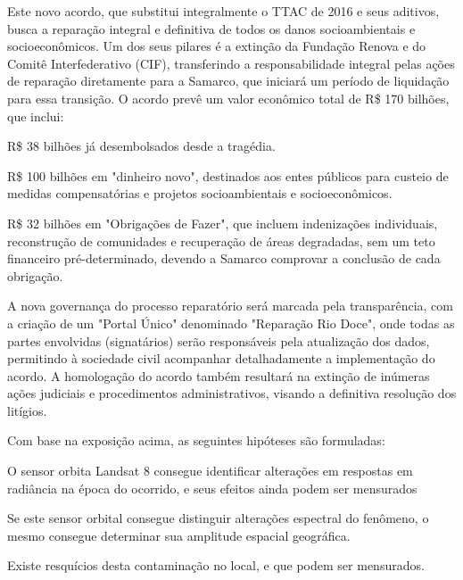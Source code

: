 %
\hspace*{1.25 cm} Este novo acordo, que substitui integralmente o TTAC de 2016 e seus aditivos, busca a reparação integral e definitiva de todos os danos socioambientais e socioeconômicos. Um dos seus pilares é a extinção da Fundação Renova e do Comitê Interfederativo (CIF), transferindo a responsabilidade integral pelas ações de reparação diretamente para a Samarco, que iniciará um período de liquidação para essa transição. O acordo prevê um valor econômico total de R\$ 170 bilhões, que inclui:
\begin{description} [itemsep=1pt,parsep=1pt]\vspace{0.00mm} 
	\item[•] R\$ 38 bilhões já desembolsados desde a tragédia.
	\item[•] R\$ 100 bilhões em "dinheiro novo", destinados aos entes públicos para custeio de medidas compensatórias e projetos socioambientais e socioeconômicos.
	\item[•] R\$ 32 bilhões em "Obrigações de Fazer", que incluem indenizações individuais, reconstrução de comunidades e recuperação de áreas degradadas, sem um teto financeiro pré-determinado, devendo a Samarco comprovar a conclusão de cada obrigação.
\end{description}

\hspace*{1.25 cm}
A nova governança do processo reparatório será marcada pela transparência, com a criação de um "Portal Único" denominado "Reparação Rio Doce", onde todas as partes envolvidas (signatários) serão responsáveis pela atualização dos dados, permitindo à sociedade civil acompanhar detalhadamente a implementação do acordo. A homologação do acordo também resultará na extinção de inúmeras ações judiciais e procedimentos administrativos, visando a definitiva resolução dos litígios.

\hspace*{1.25 cm} Com base na exposição acima, as seguintes hipóteses são formuladas:
\begin{description} [itemsep=1pt,parsep=1pt]\vspace{0.00mm} 
	\item[$H_{1}$:\label{h1}] O sensor orbita Landsat 8 consegue identificar alterações em respostas em radiância na época  do ocorrido, e seus efeitos ainda podem ser mensurados
	\item[$H_{2}$:\label{h2}] Se este sensor orbital consegue distinguir alterações espectral  do fenômeno, o mesmo consegue determinar sua amplitude espacial geográfica.
	\item[$H_{3}$:\label{h3}] Existe resquícios desta contaminação no local, e que podem ser mensurados.
\end{description}
